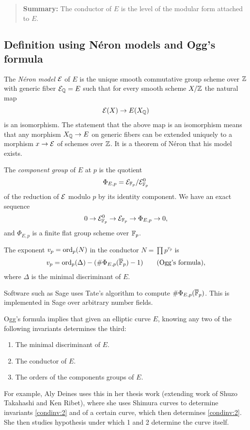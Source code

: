 \documentclass{book}
\begin{document}
\begin{quote}
{\bf Summary:} The conductor of $E$ is the level of the modular
form attached to $E$.
\end{quote}




\subsection{Definition using N\'eron models and Ogg's formula}

The {\em N\'eron model} $\mathcal{E}$ of $E$ is the unique
smooth commutative group scheme over $\mathbb{Z}$ with
generic fiber $\mathcal{E}_{\mathbb{Q}} = E$ such that for every smooth
scheme $X/\mathbb{Z}$ the natural map
$$
\mathcal{E}(X) \to E(X_{\mathbb{Q}})
$$
is an isomorphism.  The statement that the above
map is an isomorphism means that any morphism
$X_{\mathbb{Q}} \to E$ on generic fibers
can be extended uniquely to a morphism
$x \to \mathcal{E}$ of schemes over $\mathbb{Z}$.
It is a theorem of N\'eron that his model exists.

The {\em component group} of $E$ at $p$ is the quotient
$$
 \Phi_{E,p} = \mathcal{E}_{\mathbb{F}_p} / \mathcal{E}_{\mathbb{F}_p}^0
$$
of the reduction of $\mathcal{E}$ modulo $p$ by its identity component.
We have an exact sequence
$$
 0 \to \mathcal{E}_{\mathbb{F}_p}^0 \to \mathcal{E}_{\mathbb{F}_p} \to \Phi_{E,p} \to 0,
$$
and $\Phi_{E,p}$ is a finite flat group scheme over $\mathbb{F}_p$.

The exponent $v_p=\operatorname{ord}_p(N)$ in the conductor $N=\prod p^{v_p}$ is
$$
v_p = \operatorname{ord}_p(\Delta) - (\#\Phi_{E,p}(\overline{\mathbb{F}}_p) - 1) \qquad\text{(Ogg's formula)},
$$
where $\Delta$ is the minimal discriminant of $E$.

Software such as Sage uses Tate's algorithm to compute
$\#\Phi_{E,p}(\overline{\mathbb{F}}_p)$.  This is implemented in Sage over
arbitrary number fields.

Ogg's formula implies that given an elliptic curve $E$,
knowing any two of the following invariants determines the third:
\begin{enumerate}
\item\label{condinv:1} The minimal discriminant of $E$.
\item\label{condinv:2}  The conductor of $E$.
\item\label{condinv:3}  The orders of the components groups of $E$.
\end{enumerate}
For example, Aly Deines uses this in her thesis work (extending
work of Shuzo Takahashi and Ken Ribet),
where she uses Shimura curves to determine invariants
\ref{condinv:2} and \label{condinv:3} of a certain curve,
which then determines \ref{condinv:2}.
She then studies hypothesis under which 1 and
2 determine the curve itself.
\end{document}
